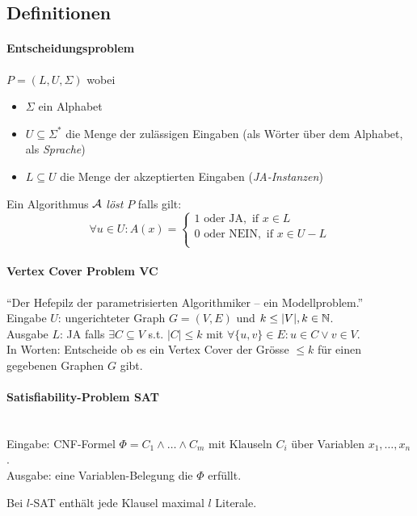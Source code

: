 \subsection{Definitionen}

\paragraph{Entscheidungsproblem}
$P = (L, U, \Sigma)$ wobei
\begin{itemize}
    \item $\Sigma$ ein Alphabet
    \item $U \subseteq \Sigma^*$ die Menge der zulässigen Eingaben (als Wörter über dem Alphabet, als \emph{Sprache})
    \item $L \subseteq U$ die Menge der akzeptierten Eingaben (\emph{JA-Instanzen})
\end{itemize}
Ein Algorithmus $\mathcal{A}$ \emph{löst} $P$ falls gilt:
$$ \forall u \in U : A(x) =
\begin{cases}
1 \text{ oder JA}, \text{ if } x \in L \\
0 \text{ oder NEIN}, \text{ if } x \in U-L \\
\end{cases}
$$

\paragraph{Vertex Cover Problem VC}
``Der Hefepilz der parametrisierten Algorithmiker -- ein Modellproblem.''
\\
Eingabe $U$: ungerichteter Graph $G = (V, E)$ und $k \leq |V|, k \in \mathbb{N}$. \\
Ausgabe $L$: JA falls $\exists C \subseteq V$ s.t. $|C| \leq k$ mit $\forall \{u, v \} \in E: u \in C \vee v \in V$.\\
In Worten: Entscheide ob es ein Vertex Cover der Grösse $\leq k$ für einen gegebenen Graphen $G$ gibt.

\paragraph{Satisfiability-Problem SAT} \mbox{} \\
Eingabe: CNF-Formel $\Phi = C_1 \wedge \dots \wedge C_m$ mit Klauseln $C_i$ über Variablen $x_1, \dots, x_n$. \\
Ausgabe: eine Variablen-Belegung die $\Phi$ erfüllt.

Bei $l$-SAT enthält jede Klausel maximal $l$ Literale.

